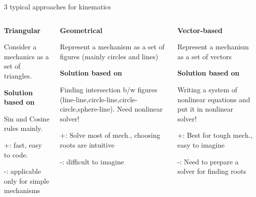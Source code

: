 \documentclass[aspectratio=169,xcolor=table,10pt, notes=hide]{beamer}
\newcommand{\fbckg}[1]{\usebackgroundtemplate{\texttt{[image: \#1]}}}%
\begin{document}
\begin{frame}[t]{3 typical approaches for kinematics}
    \begin{columns}[T,onlytextwidth]
        \begin{column}{0.32\textwidth}
            \textbf{Triangular}

            Consider a mechanics as a set of triangles.

            \textbf{Solution based on}

            Sin and Cosine rules mainly.

            +: fast, easy to code.

            -: applicable only for simple mechanisms
        \end{column}
        \begin{column}{0.32\textwidth}
            \textbf{Geometrical}

            Represent a mechanism as a set
            of figures (mainly circles and lines)

            \textbf{Solution based on}

            Finding intersection b/w figures (line-line,circle-line,circle-circle,sphere-line). Need nonlinear
            solver!

            +: Solve most of mech.,
            choosing roots are intuitive

            -: difficult to imagine
        \end{column}
        \begin{column}{0.32\textwidth}
            \textbf{Vector-based}

            Represent a mechanism
            as a set of vectors

            \textbf{Solution based on}

            Writing a system of
            nonlinear equations and
            put it in nonlinear solver!

            +: Best for tough mech.,
            easy to imagine

            -: Need to prepare a
            solver for finding roots
        \end{column}
    \end{columns}
\end{frame}

\fbckg{fibeamer/figs/last_page.png}
\frame[plain]{}
\fbckg{fibeamer/figs/common.png}
\end{document}
